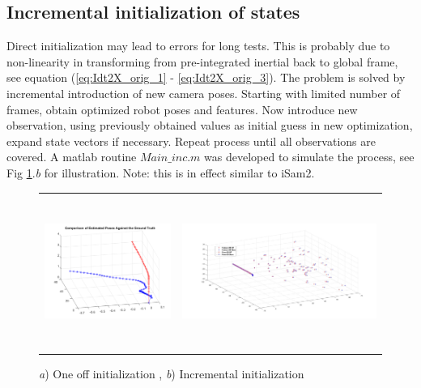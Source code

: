 \documentclass[12pt]{article}   %
\begin{document}
\subsection{Incremental initialization of states}
Direct initialization may lead to errors for long tests. This is probably due to non-linearity in transforming from pre-integrated inertial back to global frame, see equation (\ref{eq:Idt2X_orig_1} - \ref{eq:Idt2X_orig_3}). The problem is solved by incremental introduction of new camera poses. Starting with limited number of frames, obtain optimized robot poses and features. Now introduce new observation, using previously obtained values as initial guess in new optimization, expand state vectors if necessary. Repeat process until all observations are covered. A matlab routine $Main\_inc.m$ was developed to simulate the process, see Fig \ref{fig:preint_init}.\emph{b} for illustration. Note: this is in effect similar to iSam2.

	\begin{figure}[h!]
		\begin{center}\begin{tabular}{cc}
				\includegraphics[height=5cm]{figures/simuNpose_error.png} &
				\includegraphics[height=5cm]{Figures/Final_pose-feature_3D_GT-vs-SLAM.jpg}\\				
			\end{tabular}\end{center}
			\caption{\emph{a}) One off initialization , \emph{b}) Incremental initialization } 
			\label{fig:preint_init}
	\end{figure} 
\end{document}
